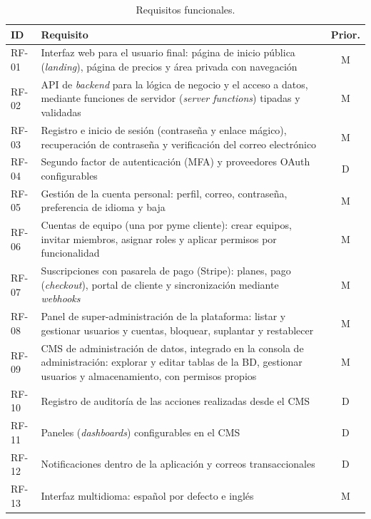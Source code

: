 \begin{table}[htbp]
  \centering
  \footnotesize
  \caption{Requisitos funcionales.}
  \label{tab:rf}
  \begin{tabularx}{\textwidth}{@{}lXc@{}}
    \toprule
    \textbf{ID} & \textbf{Requisito} & \textbf{Prior.} \\
    \midrule
    RF-01 & Interfaz web para el usuario final: página de inicio pública (\textit{landing}), página de precios y área privada con navegación & M \\
    RF-02 & API de \textit{backend} para la lógica de negocio y el acceso a datos, mediante funciones de servidor (\textit{server functions}) tipadas y validadas & M \\
    RF-03 & Registro e inicio de sesión (contraseña y enlace mágico), recuperación de contraseña y verificación del correo electrónico & M \\
    RF-04 & Segundo factor de autenticación (MFA) y proveedores OAuth configurables & D \\
    RF-05 & Gestión de la cuenta personal: perfil, correo, contraseña, preferencia de idioma y baja & M \\
    RF-06 & Cuentas de equipo (una por pyme cliente): crear equipos, invitar miembros, asignar roles y aplicar permisos por funcionalidad & M \\
    RF-07 & Suscripciones con pasarela de pago (Stripe): planes, pago (\textit{checkout}), portal de cliente y sincronización mediante \textit{webhooks} & M \\
    RF-08 & Panel de super-administración de la plataforma: listar y gestionar usuarios y cuentas, bloquear, suplantar y restablecer & M \\
    RF-09 & CMS de administración de datos, integrado en la consola de administración: explorar y editar tablas de la BD, gestionar usuarios y almacenamiento, con permisos propios & M \\
    RF-10 & Registro de auditoría de las acciones realizadas desde el CMS & D \\
    RF-11 & Paneles (\textit{dashboards}) configurables en el CMS & D \\
    RF-12 & Notificaciones dentro de la aplicación y correos transaccionales & D \\
    RF-13 & Interfaz multidioma: español por defecto e inglés & M \\
    \bottomrule
  \end{tabularx}
\end{table}

